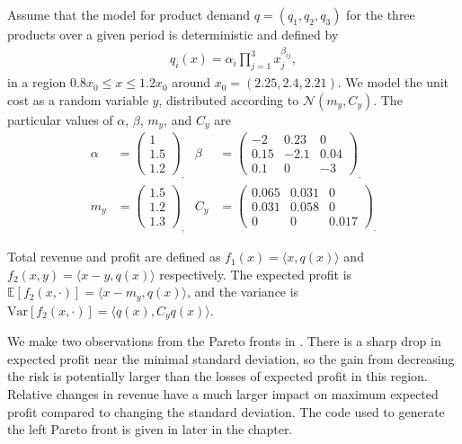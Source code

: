 \documentclass[main.tex]{subfiles}
\begin{document}
\begin{example}
  Assume that the model for product demand $q=(q_1,q_2,q_3)$ for the
  three products over a given period is
  deterministic and defined by
  \begin{align}
    q_i(x) = \alpha_i\prod_{j=1}^3x_j^{\beta_{ij}},
  \end{align}
  in a region $0.8x_0\leq x\leq 1.2x_0$ around $x_0=(2.25,2.4,2.21)$.
  We model the unit cost as a random variable $y$, distributed
  according to $\mathcal{N}(m_y,C_y)$.
  The particular values of $\alpha$, $\beta$, $m_y$, and $C_y$ are
  \begin{align}
    \alpha
    &= \left( \begin{array}{c} 1\\1.5\\1.2
              \end{array}\right)_,
    & \beta
    &= \begin{pmatrix}
      -2 & 0.23 & 0\\
      0.15 &-2.1 &0.04\\
      0.1 &0& -3
    \end{pmatrix}_,\\[0.5em]
    m_y
    &=
      \left( \begin{array}{c} 1.5\\1.2\\1.3
             \end{array}\right)_,
    & C_y
    &= \begin{pmatrix}
      0.065&0.031&0\\
      0.031 & 0.058 &0 \\
      0&0&0.017
    \end{pmatrix}_.
  \end{align}

  Total revenue and profit are defined as
  $f_1(x) = \langle x, q(x)\rangle$ and
  $f_2(x,y)= \langle x-y, q(x) \rangle$ respectively.
  The expected profit is $\mathbb{E}[f_2(x,\cdot)] = \langle x-m_y,
  q(x) \rangle$, and the variance is
  $\mbox{Var}[f_2(x,\cdot)]= \langle q(x), C_y q(x) \rangle$.

  We make two observations from the Pareto fronts in
  .
  There is a sharp drop in expected profit near
  the minimal standard deviation, so the gain from decreasing the risk is
  potentially larger than the losses of expected profit in this region.
  Relative changes in revenue have a much larger impact on maximum expected
  profit compared to changing the standard deviation.
  The code used to generate the left Pareto front is given in
   later in the chapter.
\end{example}
\end{document}
